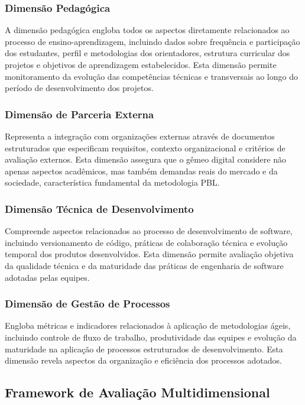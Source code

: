 \documentclass[12pt, a4paper, oneside, brazilian]{abntex2}
\begin{document}
\subsubsection{Dimensão Pedagógica}

A dimensão pedagógica engloba todos os aspectos diretamente relacionados ao processo de ensino-aprendizagem, incluindo dados sobre frequência e participação dos estudantes, perfil e metodologias dos orientadores, estrutura curricular dos projetos e objetivos de aprendizagem estabelecidos. Esta dimensão permite monitoramento da evolução das competências técnicas e transversais ao longo do período de desenvolvimento dos projetos.

\subsubsection{Dimensão de Parceria Externa}

Representa a integração com organizações externas através de documentos estruturados que especificam requisitos, contexto organizacional e critérios de avaliação externos. Esta dimensão assegura que o gêmeo digital considere não apenas aspectos acadêmicos, mas também demandas reais do mercado e da sociedade, característica fundamental da metodologia PBL.

\subsubsection{Dimensão Técnica de Desenvolvimento}

Compreende aspectos relacionados ao processo de desenvolvimento de software, incluindo versionamento de código, práticas de colaboração técnica e evolução temporal dos produtos desenvolvidos. Esta dimensão permite avaliação objetiva da qualidade técnica e da maturidade das práticas de engenharia de software adotadas pelas equipes.

\subsubsection{Dimensão de Gestão de Processos}

Engloba métricas e indicadores relacionados à aplicação de metodologias ágeis, incluindo controle de fluxo de trabalho, produtividade das equipes e evolução da maturidade na aplicação de processos estruturados de desenvolvimento. Esta dimensão revela aspectos da organização e eficiência dos processos adotados.

\subsection{Framework de Avaliação Multidimensional}
\end{document}
